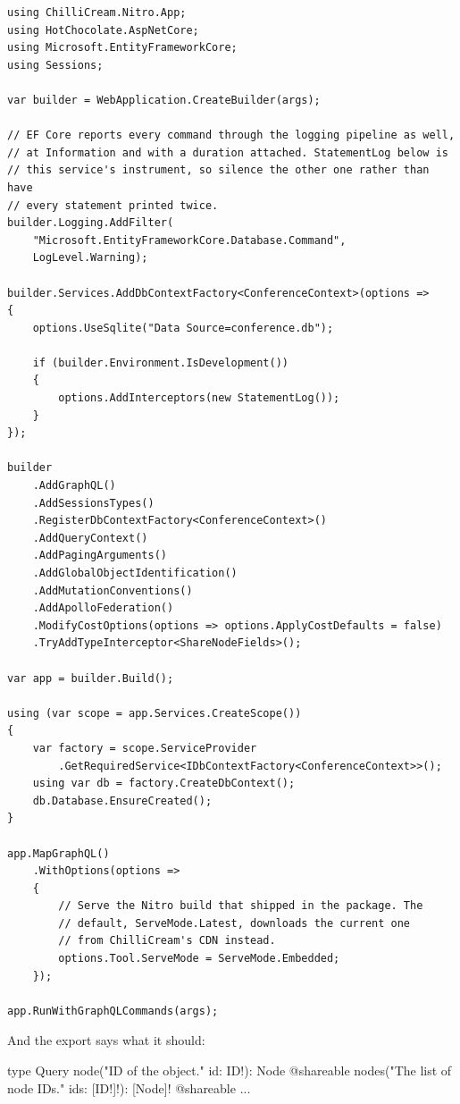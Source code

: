 \begin{verbatim}
using ChilliCream.Nitro.App;
using HotChocolate.AspNetCore;
using Microsoft.EntityFrameworkCore;
using Sessions;

var builder = WebApplication.CreateBuilder(args);

// EF Core reports every command through the logging pipeline as well,
// at Information and with a duration attached. StatementLog below is
// this service's instrument, so silence the other one rather than have
// every statement printed twice.
builder.Logging.AddFilter(
    "Microsoft.EntityFrameworkCore.Database.Command",
    LogLevel.Warning);

builder.Services.AddDbContextFactory<ConferenceContext>(options =>
{
    options.UseSqlite("Data Source=conference.db");

    if (builder.Environment.IsDevelopment())
    {
        options.AddInterceptors(new StatementLog());
    }
});

builder
    .AddGraphQL()
    .AddSessionsTypes()
    .RegisterDbContextFactory<ConferenceContext>()
    .AddQueryContext()
    .AddPagingArguments()
    .AddGlobalObjectIdentification()
    .AddMutationConventions()
    .AddApolloFederation()
    .ModifyCostOptions(options => options.ApplyCostDefaults = false)
    .TryAddTypeInterceptor<ShareNodeFields>();

var app = builder.Build();

using (var scope = app.Services.CreateScope())
{
    var factory = scope.ServiceProvider
        .GetRequiredService<IDbContextFactory<ConferenceContext>>();
    using var db = factory.CreateDbContext();
    db.Database.EnsureCreated();
}

app.MapGraphQL()
    .WithOptions(options =>
    {
        // Serve the Nitro build that shipped in the package. The
        // default, ServeMode.Latest, downloads the current one
        // from ChilliCream's CDN instead.
        options.Tool.ServeMode = ServeMode.Embedded;
    });

app.RunWithGraphQLCommands(args);
\end{verbatim}

%
And the export says what it should:

\begin{graphqlsdl}
type Query {
  node("ID of the object." id: ID!): Node @shareable
  nodes("The list of node IDs." ids: [ID!]!): [Node]! @shareable
  ...
}
\end{graphqlsdl}

